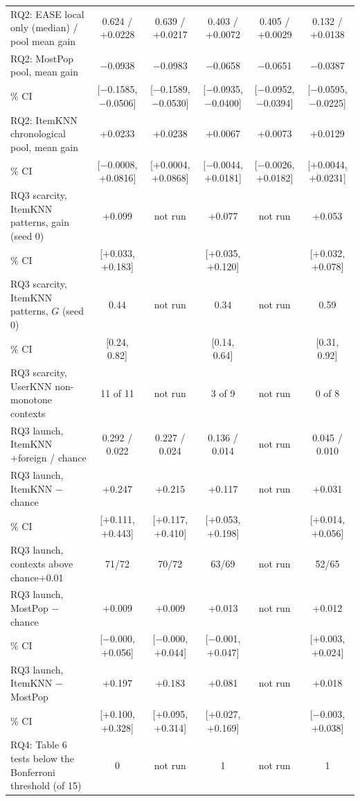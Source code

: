 \begin{table}[H]
\begin{tabular}{>{\raggedright\arraybackslash}p{4.8cm}ccccc}
RQ2: EASE local only (median) / pool mean gain & 0.624 / +0.0228 & 0.639 / +0.0217 & 0.403 / +0.0072 & 0.405 / +0.0029 & 0.132 / +0.0138 \\
RQ2: MostPop pool, mean gain & $-$0.0938 & $-$0.0983 & $-$0.0658 & $-$0.0651 & $-$0.0387 \\
\quad 95\% CI & [$-$0.1585, $-$0.0506] & [$-$0.1589, $-$0.0530] & [$-$0.0935, $-$0.0400] & [$-$0.0952, $-$0.0394] & [$-$0.0595, $-$0.0225] \\[1pt]
RQ2: ItemKNN chronological pool, mean gain & +0.0233 & +0.0238 & +0.0067 & +0.0073 & +0.0129 \\
\quad 95\% CI & [$-$0.0008, +0.0816] & [+0.0004, +0.0868] & [$-$0.0044, +0.0181] & [$-$0.0026, +0.0182] & [+0.0044, +0.0231] \\[1pt]
RQ3 scarcity, ItemKNN patterns, gain (seed 0) & +0.099 & not run & +0.077 & not run & +0.053 \\
\quad 95\% CI & [+0.033, +0.183] &  & [+0.035, +0.120] &  & [+0.032, +0.078] \\[1pt]
RQ3 scarcity, ItemKNN patterns, $G$ (seed 0) & 0.44 & not run & 0.34 & not run & 0.59 \\
\quad 95\% CI & [0.24, 0.82] &  & [0.14, 0.64] &  & [0.31, 0.92] \\[1pt]
RQ3 scarcity, UserKNN non-monotone contexts & 11 of 11 & not run & 3 of 9 & not run & 0 of 8 \\
RQ3 launch, ItemKNN +foreign / chance & 0.292 / 0.022 & 0.227 / 0.024 & 0.136 / 0.014 & not run & 0.045 / 0.010 \\
RQ3 launch, ItemKNN $-$chance & +0.247 & +0.215 & +0.117 & not run & +0.031 \\
\quad 95\% CI & [+0.111, +0.443] & [+0.117, +0.410] & [+0.053, +0.198] &  & [+0.014, +0.056] \\[1pt]
RQ3 launch, contexts above chance+0.01 & 71/72 & 70/72 & 63/69 & not run & 52/65 \\
RQ3 launch, MostPop $-$chance & +0.009 & +0.009 & +0.013 & not run & +0.012 \\
\quad 95\% CI & [$-$0.000, +0.056] & [$-$0.000, +0.044] & [$-$0.001, +0.047] &  & [+0.003, +0.024] \\[1pt]
RQ3 launch, ItemKNN $-$ MostPop & +0.197 & +0.183 & +0.081 & not run & +0.018 \\
\quad 95\% CI & [+0.100, +0.328] & [+0.095, +0.314] & [+0.027, +0.169] &  & [$-$0.003, +0.038] \\[1pt]
RQ4: Table 6 tests below the Bonferroni threshold (of 15) & 0 & not run & 1 & not run & 1 \\

\end{tabular}
\end{table}
